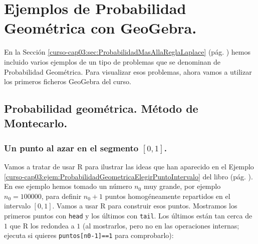 \documentclass[10pt,a4paper]{article}\usepackage[]{graphicx}\usepackage[]{color}
\begin{document}
\section{Ejemplos de Probabilidad Geométrica con GeoGebra.}
\label{tut03:sec:EjemplosProbabilidadGeometricaGeoGebra}

En la Sección \ref{curso-cap03:sec:ProbabilidadMasAllaReglaLaplace} (pág. \pageref{curso-cap03:sec:ProbabilidadMasAllaReglaLaplace}) hemos incluido varios ejemplos de un tipo de problemas que se denominan de Probabilidad Geométrica. Para visualizar esos problemas, ahora vamos a utilizar los primeros ficheros GeoGebra del curso.

\subsection{Probabilidad geométrica. Método de Montecarlo.}

\subsubsection{Un punto al azar en el segmento $[0,1]$.}

Vamos a tratar de usar R para ilustrar las ideas que han aparecido en el Ejemplo \ref{curso-cap03:ejem:ProbabilidadGeometricaElegirPuntoIntervalo} del libro (pág. \pageref{curso-cap03:ejem:ProbabilidadGeometricaElegirPuntoIntervalo}). En ese ejemplo hemos tomado un número $n_0$ muy grande, por ejemplo $n_0=100000$, para definir $n_0+1$ puntos homogéneamente repartidos en el intervalo $[0,1]$. Vamos a usar R para construir esos puntos. Mostramos los primeros puntos con {\tt head} y los últimos con {\tt tail}. Los últimos están tan cerca de $1$ que R los redondea a $1$ (al mostrarlos, pero no en las operaciones internas; ejecuta si quieres {\tt puntos[n0-1]==1} para comprobarlo):
     
\end{document}
